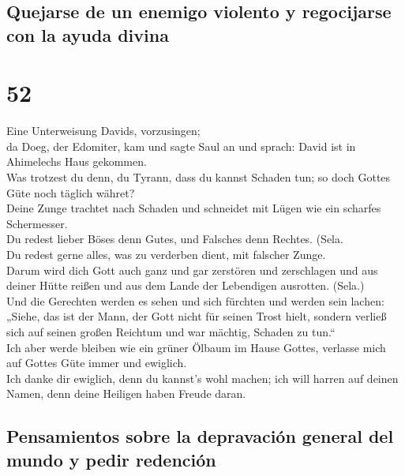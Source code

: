 \hypertarget{quejarse-de-un-enemigo-violento-y-regocijarse-con-la-ayuda-divina}{%
\subsection{Quejarse de un enemigo violento y regocijarse con la ayuda
divina}\label{quejarse-de-un-enemigo-violento-y-regocijarse-con-la-ayuda-divina}}

\hypertarget{section-51}{%
\section{52}\label{section-51}}

 Eine Unterweisung Davids, vorzusingen;\\
 da Doeg, der Edomiter, kam und sagte Saul an und sprach:
David ist in Ahimelechs Haus gekommen.\\
 Was trotzest du denn, du Tyrann, dass du kannst Schaden
tun; so doch Gottes Güte noch täglich währet?\\
 Deine Zunge trachtet nach Schaden und schneidet mit Lügen
wie ein scharfes Schermesser.\\
 Du redest lieber Böses denn Gutes, und Falsches denn
Rechtes. (Sela.\\
 Du redest gerne alles, was zu verderben dient, mit
falscher Zunge.\\
 Darum wird dich Gott auch ganz und gar zerstören und
zerschlagen und aus deiner Hütte reißen und aus dem Lande der Lebendigen
ausrotten. (Sela.)\\
 Und die Gerechten werden es sehen und sich fürchten und
werden sein lachen:\\
 „Siehe, das ist der Mann, der Gott nicht für seinen Trost
hielt, sondern verließ sich auf seinen großen Reichtum und war mächtig,
Schaden zu tun.``\\
 Ich aber werde bleiben wie ein grüner Ölbaum im Hause
Gottes, verlasse mich auf Gottes Güte immer und ewiglich.\\
 Ich danke dir ewiglich, denn du kannst's wohl machen;
ich will harren auf deinen Namen, denn deine Heiligen haben Freude
daran.

\hypertarget{pensamientos-sobre-la-depravaciuxf3n-general-del-mundo-y-pedir-redenciuxf3n-1}{%
\subsection{Pensamientos sobre la depravación general del mundo y pedir
redención}\label{pensamientos-sobre-la-depravaciuxf3n-general-del-mundo-y-pedir-redenciuxf3n-1}}


